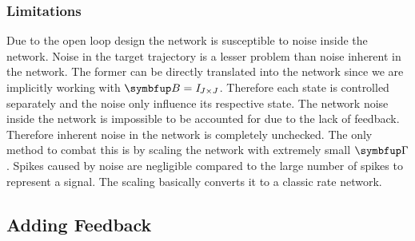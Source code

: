 \subsubsection{Limitations}

Due to the open loop design the network is susceptible to noise inside the network. Noise in the target trajectory is a lesser problem than noise inherent in the network. The former can be directly translated into the network since we are implicitly working with $\bmu{B} = \mathit{I}_{J\times J}$. Therefore each state is controlled separately and the noise only influence its respective state. The network noise inside the network is impossible to be accounted for due to the lack of feedback. Therefore inherent noise in the network is completely unchecked. The only method to combat this is by scaling the network with extremely small $\bmu{\Gamma}$. Spikes caused by noise are negligible compared to the large number of spikes to represent a signal. The scaling basically converts it to a classic rate network.\\
\subsection{Adding Feedback}

